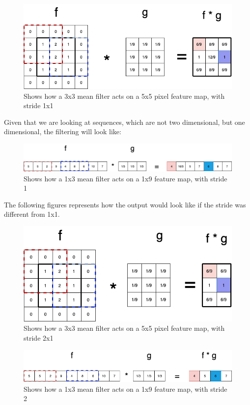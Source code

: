 \begin{figure}[!ht]
  \centering
  \includegraphics[scale=0.4]{latex/imgs/conv1.png}
  \caption{Shows how a 3x3 mean filter acts on a 5x5 pixel feature map, with stride 1x1}\label{Baseline:before}
\end{figure}

\noindent
Given that we are looking at sequences, which are not two dimensional, but one dimensional, the filtering will look like:

\begin{figure}[!ht]
  \centering
  \includegraphics[scale=0.4]{latex/imgs/conv2.png}
  \caption{Shows how a 1x3 mean filter acts on a 1x9 feature map, with stride 1}\label{Baseline:before}
\end{figure}

\noindent
The following figures represents how the output would look like if the stride was different from 1x1.

\begin{figure}[!ht]
  \centering
  \includegraphics[scale=0.4]{latex/imgs/conv1_stride.png}
  \caption{Shows how a 3x3 mean filter acts on a 5x5 pixel feature map, with stride 2x1}\label{Baseline:before}
\end{figure}

\begin{figure}[!ht]
  \centering
  \includegraphics[scale=0.4]{latex/imgs/conv2_stride.png}
  \caption{Shows how a 1x3 mean filter acts on a 1x9 feature map, with stride 2}\label{Baseline:before}
\end{figure}

